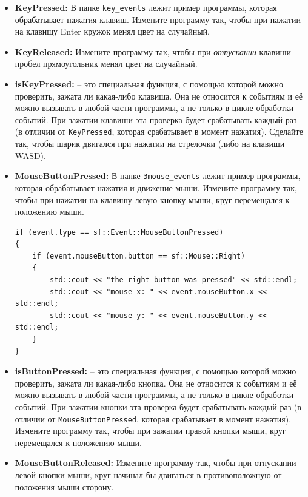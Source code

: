 \documentclass{article}
\begin{document}
\begin{itemize}
\item \textbf{KeyPressed:} В папке \texttt{key\_events} лежит пример программы, которая обрабатывает нажатия клавиш. Измените программу так, чтобы при нажатии на клавишу Enter кружок менял цвет на случайный.

\item \textbf{KeyReleased:} Измените программу так, чтобы при \textit{отпускании} клавиши пробел прямоугольник менял цвет на случайный.

\item \textbf{isKeyPressed:} -- это специальная функция, с помощью которой можно проверить, зажата ли какая-либо клавиша. Она не относится к событиям и её можно вызывать в любой части программы, а не только в цикле обработки событий. При зажатии клавиши эта проверка будет срабатывать каждый раз (в отличии от \texttt{KeyPressed}, которая срабатывает в момент нажатия). Сделайте так, чтобы шарик двигался при нажатии на стрелочки (либо на клавиши WASD).

\item \textbf{MouseButtonPressed:} В папке \texttt{3mouse\_events} лежит пример программы, которая обрабатывает нажатия и движение мыши. Измените программу так, чтобы при нажатии на клавишу левую кнопку мыши, круг перемещался к положению мыши.
\begin{lstlisting}
if (event.type == sf::Event::MouseButtonPressed)
{
    if (event.mouseButton.button == sf::Mouse::Right)
    {
        std::cout << "the right button was pressed" << std::endl;
        std::cout << "mouse x: " << event.mouseButton.x << std::endl;
        std::cout << "mouse y: " << event.mouseButton.y << std::endl;
    }
}
\end{lstlisting}

\item \textbf{isButtonPressed:} -- это специальная функция, с помощью которой можно проверить, зажата ли какая-либо кнопка. Она не относится к событиям и её можно вызывать в любой части программы, а не только в цикле обработки событий. При зажатии кнопки эта проверка будет срабатывать каждый раз (в отличии от \texttt{MouseButtonPressed}, которая срабатывает в момент нажатия). Измените программу так, чтобы при зажатии правой кнопки мыши, круг перемещался к положению мыши.

\item \textbf{MouseButtonReleased:} Измените программу так, чтобы при отпускании левой кнопки мыши, круг начинал бы двигаться в противоположную от положения мыши сторону.


\end{itemize}
\end{document}
